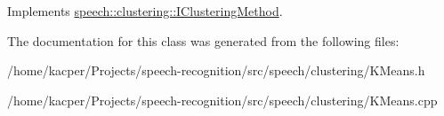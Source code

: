Implements \hyperlink{classspeech_1_1clustering_1_1IClusteringMethod_a9676e73a7c47d5383e9359850086249c}{speech\+::clustering\+::\+I\+Clustering\+Method}.



The documentation for this class was generated from the following files\+:\begin{DoxyCompactItemize}
\item 
/home/kacper/\+Projects/speech-\/recognition/src/speech/clustering/K\+Means.\+h\item 
/home/kacper/\+Projects/speech-\/recognition/src/speech/clustering/K\+Means.\+cpp\end{DoxyCompactItemize}
